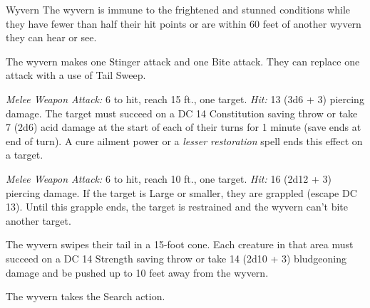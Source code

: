 \documentclass[10pt,a4paper,twoside,bg=print,twocolumn,openany,nodeprecatedcode]{dndbook}
\begin{document}
\begin{DndMonster}[float=t]{Wyvern}
\DndMonsterBasics[
armor-class = {12 (natural armor)},
hit-points = {\DndDice{14d10 + 42}},
speed = {20 ft., fly 60 ft.}
]
\DndMonsterAbilityScores[
 str = 17,
 dex = 12,
 con = 16,
 int = 4,
 wis = 14,
 cha = 6
]
\DndMonsterDetails[
skills = {Athletics +6, Perception +5},
damage-immunities = {acid},
senses = {darkvision 60 ft., passive perception 15},
challenge = 6,
]
The wyvern is immune to the frightened and stunned conditions while they have fewer than half their hit points or are within 60 feet of another wyvern they can hear or see.

The wyvern makes one Stinger attack and one Bite attack. They can replace one attack with a use of Tail Sweep.

\textsl{Melee Weapon Attack:} 6 to hit, reach 15 ft., one target. \textsl{Hit:} 13 (3d6 + 3) piercing damage. The target must succeed on a DC 14 Constitution saving throw or take 7 (2d6) acid damage at the start of each of their turns for 1 minute (save ends at end of turn). A cure ailment power or a \textit{lesser restoration} spell ends this effect on a target.

\textsl{Melee Weapon Attack:} 6 to hit, reach 10 ft., one target. \textsl{Hit:} 16 (2d12 + 3) piercing damage. If the target is Large or smaller, they are grappled (escape DC 13). Until this grapple ends, the target is restrained and the wyvern can't bite another target.

The wyvern swipes their tail in a 15-foot cone. Each creature in that area must succeed on a DC 14 Strength saving throw or take 14 (2d10 + 3) bludgeoning damage and be pushed up to 10 feet away from the wyvern.

The wyvern takes the Search action.

\end{DndMonster}
\end{document}
